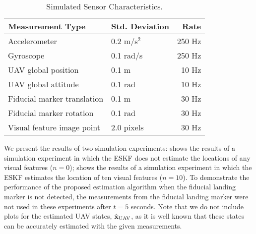 \begin{table}[h!]
  \begin{center}
    \caption{Simulated Sensor Characteristics.}
    \label{tab:sim_meas_noise}
    \begin{tabular}{l|l|r}
      \textbf{Measurement Type} & \textbf{Std. Deviation} & \textbf{Rate} \\
      \hline
      Accelerometer & 0.2 m/s$^2$ & 250 Hz \\
      Gyroscope & 0.1 rad/s & 250 Hz \\
      UAV global position & 0.1 m & 10 Hz \\
      UAV global attitude & 0.1 rad & 10 Hz \\
      Fiducial marker translation & 0.1 m & 30 Hz \\
      Fiducial marker rotation & 0.1 rad & 30 Hz \\
      Visual feature image point & 2.0 pixels & 30 Hz \\
    \end{tabular}
  \end{center}
\end{table}

We present the results of two simulation experiments:
 shows the results of a simulation experiment in which the ESKF
does not estimate the locations of any visual features ($n = 0$);
 shows the results of a simulation experiment in which
the ESKF estimates the location of ten visual features ($n = 10$).
To demonstrate the performance of the proposed estimation algorithm when the
fiducial landing marker is not detected, the measurements from the fiducial
landing marker were not used in these experiments after $t = 5$
seconds.
Note that we
do not include plots for the estimated UAV states, $\hat{\mathrm{\mathbf{x}}}_{\text{UAV}}$,
as it is well known that these states can be accurately estimated with the given
measurements.

